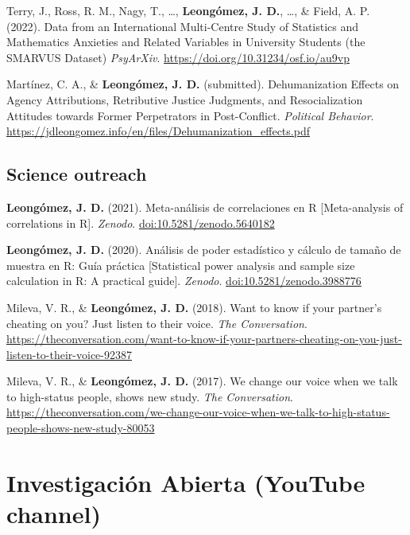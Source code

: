 \documentclass[11pt,a4paper,]{awesome-cv}
\begin{document}
\begingroup
\setlength{\parindent}{-0.5in}
\setlength{\leftskip}{0.5in}

Terry, J., Ross, R. M., Nagy, T., \ldots, \textbf{Leongómez, J. D.},
\ldots, \& Field, A. P. (2022). Data from an International Multi-Centre
Study of Statistics and Mathematics Anxieties and Related Variables in
University Students (the SMARVUS Dataset) \emph{PsyArXiv}.
\url{https://doi.org/10.31234/osf.io/au9vp}

Martínez, C. A., \& \textbf{Leongómez, J. D.} (submitted).
Dehumanization Effects on Agency Attributions, Retributive Justice
Judgments, and Resocialization Attitudes towards Former Perpetrators in
Post-Conflict. \emph{Political Behavior}.
\url{https://jdleongomez.info/en/files/Dehumanization_effects.pdf}

\endgroup

\hypertarget{section-2}{%
\subsection{\texorpdfstring{\textbf{Science outreach}}{}}\label{section-2}}

\begingroup
\setlength{\parindent}{-0.5in}
\setlength{\leftskip}{0.5in}

\textbf{Leongómez, J. D.} (2021). Meta-análisis de correlaciones en R
{[}Meta-analysis of correlations in R{]}. \emph{Zenodo}.
\url{doi:10.5281/zenodo.5640182}

\textbf{Leongómez, J. D.} (2020). Análisis de poder estadístico y
cálculo de tamaño de muestra en R: Guía práctica {[}Statistical power
analysis and sample size calculation in R: A practical guide{]}.
\emph{Zenodo}. \url{doi:10.5281/zenodo.3988776}

Mileva, V. R., \& \textbf{Leongómez, J. D.} (2018). Want to know if your
partner's cheating on you? Just listen to their voice. \emph{The
Conversation}.
\url{https://theconversation.com/want-to-know-if-your-partners-cheating-on-you-just-listen-to-their-voice-92387}

Mileva, V. R., \& \textbf{Leongómez, J. D.} (2017). We change our voice
when we talk to high-status people, shows new study. \emph{The
Conversation}.
\url{https://theconversation.com/we-change-our-voice-when-we-talk-to-high-status-people-shows-new-study-80053}

\endgroup

\hypertarget{investigaciuxf3n-abierta-youtube-channel}{%
\section{Investigación Abierta (YouTube
channel)}\label{investigaciuxf3n-abierta-youtube-channel}}
\end{document}
